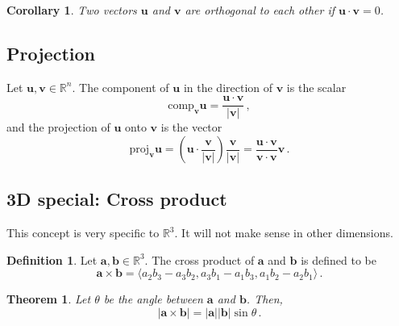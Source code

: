 \documentclass[
]{book}
\newtheorem{theorem}{Theorem}[chapter]
\newtheorem{corollary}{Corollary}[chapter]
\theoremstyle{definition}
\newtheorem{definition}{Definition}[chapter]
\theoremstyle{definition}
\theoremstyle{definition}
\theoremstyle{definition}
\theoremstyle{remark}
\begin{document}
\begin{corollary}
Two vectors \(\textbf{u}\) and \(\textbf{v}\) are orthogonal to each other
if \(\textbf{u} \cdot \textbf{v} = 0\).
\end{corollary}

\hypertarget{projection}{%
\subsection*{Projection}\label{projection}}


Let \(\textbf{u}, \textbf{v}\in \mathbb{R}^n\). The component of \(\textbf{u}\)
in the direction of \(\textbf{v}\) is the scalar
\begin{equation*}
\mathrm{comp}_{\mathbf{v}}\mathbf{u} = \frac{\mathbf{u}\cdot \mathbf{v}}{|\mathbf{v}|} \,,
\end{equation*}
and the projection of \(\mathbf{u}\) onto \(\mathbf{v}\) is the vector
\begin{equation*}
    \mathrm{proj}_{\mathbf{v}}\mathbf{u} 
    =\left( \mathbf{u}\cdot \frac{\mathbf{v}}{|\mathbf{v}|}\right) \frac{\mathbf{v}}{|\mathbf{v}|} 
    = \frac{\mathbf{u}\cdot \mathbf{v}}{\mathbf{v} \cdot\mathbf{v}} \mathbf{v} \,.
\end{equation*}

\hypertarget{d-special-cross-product}{%
\subsection{3D special: Cross product}\label{d-special-cross-product}}

This concept is very specific to \(\mathbb{R}^3\).
It will not make sense in other dimensions.

\begin{definition}
Let \(\mathbf{a}, \mathbf{b} \in \mathbb{R}^3\).
The cross product of \(\mathbf{a}\) and \(\mathbf{b}\) is defined to be
\begin{equation*}
    \mathbf{a} \times \mathbf{b} = \langle a_2 b_3 - a_3 b_2, a_3b_1 - a_1 b_3, a_1b_2 - a_2b_1 \rangle \,.
\end{equation*}
\end{definition}

\begin{theorem}
Let \(\theta\) be the angle between \(\mathbf{a}\) and \(\mathbf{b}\). Then,
\begin{equation*}
    | \mathbf{a} \times \mathbf{b} | = |\mathbf{a}||\mathbf{b}| \sin\theta \,.
\end{equation*}
\end{theorem}
\end{document}
